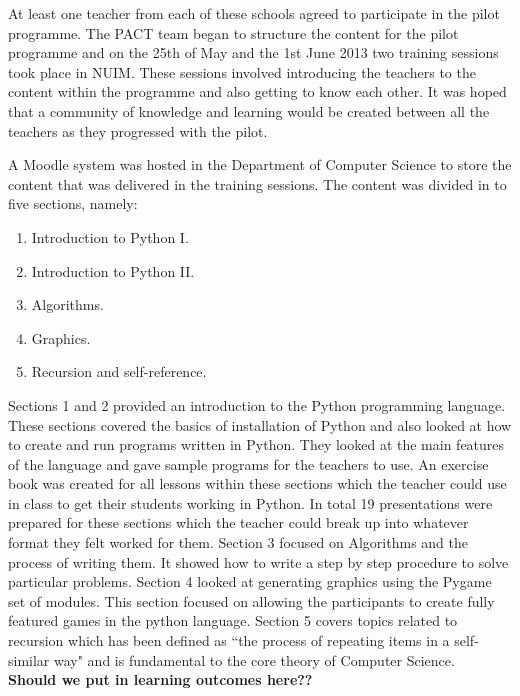 \documentclass{article}
\begin{document}
At least one teacher from each of these schools agreed to participate in the pilot programme. The PACT team began to structure the content for the pilot programme and on the 25th of May and the 1st June 2013 two training sessions took place in NUIM. These sessions involved introducing the teachers to the content within the programme and also getting to know each other. It was hoped that a community of knowledge and learning would be created between all the teachers as they progressed with the pilot.

A Moodle system was hosted in the Department of Computer Science to store the content that was delivered in the training sessions. The content was divided in to five sections, namely:

\begin{enumerate}
  \item Introduction to Python I.
  \item Introduction to Python II.
  \item Algorithms.
  \item Graphics.
  \item Recursion and self-reference.
\end{enumerate}

Sections 1 and 2 provided an introduction to the Python programming language. These sections covered the basics of installation of Python and also looked at how to create and run programs written in Python. They looked at the main features of the language and gave sample programs for the teachers to use. An exercise book was created for all lessons within these sections which the teacher could use in class to get their students working in Python. In total 19 presentations were prepared for these sections which the teacher could break up into whatever format they felt worked for them. Section 3 focused on Algorithms and the process of writing them. It showed how to write a step by step procedure to solve particular problems. Section 4 looked at generating graphics using the Pygame set of modules. This section focused on allowing the participants to create fully featured games in the python language. Section 5 covers topics related to recursion which has been defined as ``the process of repeating items in a self-similar way" and is fundamental to the core theory of Computer Science. \\


\textbf{Should we put in learning outcomes here??}
\newline
\end{document}
